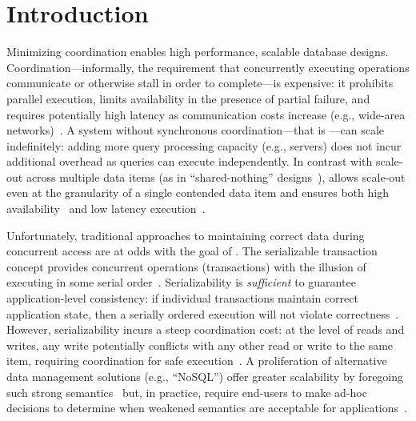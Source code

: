 
\section{Introduction}
\label{sec:intro}


Minimizing coordination enables high performance, scalable database
designs. Coordination---informally, the requirement that concurrently
executing operations communicate or otherwise stall in order to
complete---is expensive: it prohibits parallel execution, limits
availability in the presence of partial failure, and requires
potentially high latency as communication costs increase (e.g.,
wide-area networks)~\cite{hat-vldb,gilbert-cap}. A system without
synchronous coordination---that is \textit{\cfree}---can scale
indefinitely: adding more query processing capacity (e.g., servers)
does not incur additional overhead as queries can execute
independently. In contrast with scale-out across multiple data items
(as in ``shared-nothing''
designs~\cite{bernstein-book,f1,spanner,pnuts,hstore}), \cfreedom
allows scale-out even at the granularity of a single contended data
item and ensures both high availability~\cite{gilbert-cap} and low
latency execution~\cite{pacelc}.


Unfortunately, traditional approaches to maintaining correct data
during concurrent access are at odds with the goal of \cfreedom. The
serializable transaction concept provides concurrent operations
(transactions) with the illusion of executing in some serial
order~\cite{bernstein-book}. Serializability is \textit{sufficient} to
guarantee application-level consistency: if individual transactions
maintain correct application state, then a serially ordered execution
will not violate correctness~\cite{gray-virtues}. However,
serializability incurs a steep coordination cost: at the level of
reads and writes, any write potentially conflicts with any other read
or write to the same item, requiring coordination for safe
execution~\cite{hat-vldb,davidson-survey}. A proliferation of
alternative data management solutions (e.g., ``NoSQL'') offer greater
scalability by foregoing such strong
semantics~\cite{dynamo,optimistic} but, in practice, require end-users
to make ad-hoc decisions to determine when weakened semantics are
acceptable for applications~\cite{consistency-borders}.


